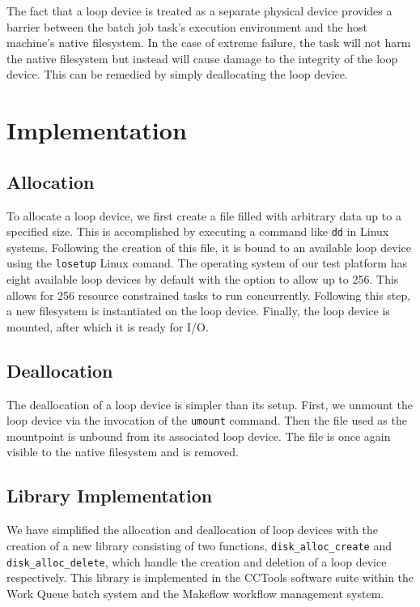 \documentclass[conference]{IEEEtran}
\begin{document}
The fact that a loop device is treated as a separate physical device provides a barrier between the batch job task's execution environment and the host machine's native filesystem. In the case of extreme failure, the task will not harm the native filesystem but instead will cause damage to the integrity of the loop device. This can be remedied by simply deallocating the loop device.

\section{Implementation}

\subsection{Allocation}
To allocate a loop device, we first create a file filled with arbitrary data up to a specified size. This is accomplished by executing a command like {\tt{dd}} in Linux systems. Following the creation of this file, it is bound to an available loop device using the {\tt{losetup}} Linux comand. The operating system of our test platform has eight available loop devices by default with the option to allow up to 256. This allows for 256 resource constrained tasks to run concurrently. Following this step, a new filesystem is instantiated on the loop device. Finally, the loop device is mounted, after which it is ready for I/O.

\subsection{Deallocation}
The deallocation of a loop device is simpler than its setup. First, we unmount the loop device via the invocation of the {\tt{umount}} command. Then the file used as the mountpoint is unbound from its associated loop device. The file is once again visible to the native filesystem and is removed.

\subsection{Library Implementation}
We have simplified the allocation and deallocation of loop devices with the creation of a new library consisting of two functions, {\tt{disk\_alloc\_create}} and {\tt{disk\_alloc\_delete}}, which handle the creation and deletion of a loop device respectively. This library is implemented in the CCTools software suite within the Work Queue batch system and the Makeflow workflow management system.
\end{document}
